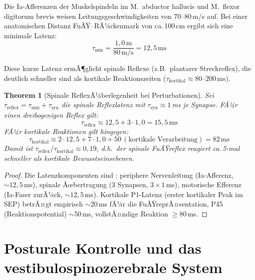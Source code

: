 ﻿\documentclass[12pt,a4paper]{report}
\theoremstyle{plain}
\newtheorem{theorem}{Theorem}[section]
\theoremstyle{definition}
\theoremstyle{remark}
\begin{document}
Die Ia-Afferenzen der Muskelspindeln im M.\ abductor hallucis und
M.\ flexor digitorum brevis weisen Leitungsgeschwindigkeiten von
70--80\,m/s auf. Bei einer anatomischen Distanz FuÃŸ--RÃ¼ckenmark von
ca.\,100\,cm ergibt sich eine minimale Latenz:
\[
  \tau_{\min} = \frac{1{,}0\,\text{m}}{80\,\text{m/s}} = 12{,}5\,\text{ms}
\]

Diese kurze Latenz ermÃ¶glicht spinale Reflexe (z.B.\ plantarer Streckreflex),
die deutlich schneller sind als kortikale Reaktionszeiten
($\tau_{\text{kortikal}} \approx 80$--$200$\,ms).

\begin{theorem}[Spinale ReflexÃ¼berlegenheit bei Perturbationen]
Sei $\tau_{\text{reflex}} = \tau_{\min} + \tau_{\text{syn}}$ die spinale Reflexlatenz
mit $\tau_{\text{syn}} \approx 1$\,ms je Synapse. FÃ¼r einen dreibogenigen Reflex gilt:
\[
  \tau_{\text{reflex}} \approx 12{,}5 + 3 \cdot 1{,}0 = 15{,}5\,\text{ms}
\]
FÃ¼r kortikale Reaktionen gilt hingegen:
\[
  \tau_{\text{kortikal}} \approx 2 \cdot 12{,}5 + 7 \cdot 1{,}0 + 50\,(\text{kortikale Verarbeitung})
  = 82\,\text{ms}
\]
Damit ist $\tau_{\text{reflex}} / \tau_{\text{kortikal}} \approx 0{,}19$, d.h.\ der spinale
FuÃŸreflex reagiert ca.\,5-mal schneller als kortikale Bewusstseinsebenen.
\end{theorem}

\begin{proof}
Die Latenzkomponenten sind \cite{kandel2000}: periphere Nervenleitung
(Ia-Afferenz, $\sim 12{,}5$\,ms), spinale Ãœbertragung (3 Synapsen,
$3 \times 1$\,ms), motorische Efferenz (Ia-Faser zurÃ¼ck, $\sim 12{,}5$\,ms).
Kortikale P1-Latenz (erster kortikaler Peak im SEP) betrÃ¤gt empirisch
$\sim$20\,ms fÃ¼r die FuÃŸreprÃ¤sentation, P45 (Reaktionspotential)
$\sim$50\,ms, vollstÃ¤ndige Reaktion $\geq 80$\,ms.
\end{proof}

\chapter{Posturale Kontrolle und das vestibulospinozerebrale System}
\end{document}
